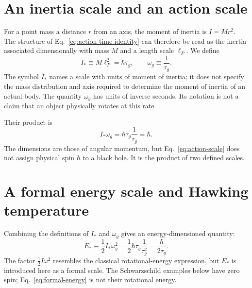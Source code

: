 \documentclass[12pt]{article}
\begin{document}
\section{An inertia scale and an action scale}

For a point mass a distance $r$ from an axis, the moment of inertia is $I=Mr^2$. The structure of Eq.~\eqref{eq:action-time-identity} can therefore be read as the inertia associated dimensionally with mass $M$ and a length scale $\ell_P$. We define
\begin{equation}
  I_*\equiv M\ell_P^2=\hbar\tau_g,
  \qquad
  \omega_g\equiv\frac{1}{\tau_g}.
  \label{eq:defined-scales}
\end{equation}
The symbol $I_*$ names a scale with units of moment of inertia; it does not specify the mass distribution and axis required to determine the moment of inertia of an actual body. The quantity $\omega_g$ has units of inverse seconds. Its notation is not a claim that an object physically rotates at this rate.

Their product is
\begin{equation}
  I_*\omega_g
  =\hbar\tau_g\frac{1}{\tau_g}
  =\hbar.
  \label{eq:action-scale}
\end{equation}
The dimensions are those of angular momentum, but Eq.~\eqref{eq:action-scale} does not assign physical spin $\hbar$ to a black hole. It is the product of two defined scales.

\section{A formal energy scale and Hawking temperature}

Combining the definitions of $I_*$ and $\omega_g$ gives an energy-dimensioned quantity:
\begin{equation}
  E_*\equiv\frac{1}{2}I_*\omega_g^2
  =\frac{1}{2}\hbar\tau_g\frac{1}{\tau_g^2}
  =\frac{\hbar}{2\tau_g}.
  \label{eq:formal-energy}
\end{equation}
The factor $\tfrac12 I\omega^2$ resembles the classical rotational-energy expression, but $E_*$ is introduced here as a formal scale. The Schwarzschild examples below have zero spin; Eq.~\eqref{eq:formal-energy} is not their rotational energy.
\end{document}
